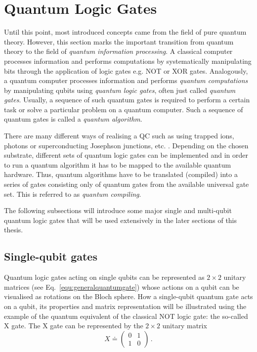 \section{Quantum Logic Gates}
\label{subsec:quantumlogicgates}
Until this point, most introduced concepts came from the field of pure quantum theory. However, this section marks the important transition from quantum theory to the field of \emph{quantum information processing}. A classical computer processes information and performs computations by systematically manipulating bits through the application of logic gates e.g. NOT or XOR gates. Analogously, a quantum computer processes information and performs \emph{quantum computations} by manipulating qubits using \emph{quantum logic gates}, often just called \emph{quantum gates}. Usually, a sequence of such quantum gates is required to perform a certain task or solve a particular problem on a quantum computer. Such a sequence of quantum gates is called a \emph{quantum algorithm}. 

There are many different ways of realising a QC such as using trapped ions, photons or superconducting Josephson junctions, etc. \cite{clarke2008superconducting,haffner2008quantum,o2007optical}. Depending on the chosen substrate, different sets of quantum logic gates can be implemented and in order to run a quantum algorithm it has to be mapped to the available quantum hardware. Thus, quantum algorithms have to be translated (compiled) into a series of gates consisting only of quantum gates from the available universal gate set. This is referred to as \emph{quantum compiling}. 

The following subsections will introduce some major single and multi-qubit quantum logic gates that will be used extensively in the later sections of this thesis.

\subsection{Single-qubit gates}
\label{subsubsec:singlequbitgates} 
Quantum logic gates acting on single qubits can be represented as $2\times2$ unitary matrices (see Eq.~\ref{equ:generalquantumgate}) whose actions on a qubit can be visualised as rotations on the Bloch sphere. How a single-qubit quantum gate acts on a qubit, its properties and matrix representation will be illustrated using the example of the quantum equivalent of the classical NOT logic gate: the so-called X gate. The X gate can be represented by the $2\times2$ unitary matrix
\begin{equation}
X \doteq \begin{pmatrix}
 0 & 1 \\ 
 1 & 0
 \end{pmatrix}\, .
\end{equation}

